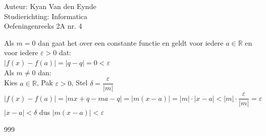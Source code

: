 \documentclass[a4paper]{article}
\begin{document}
  
\noindent \large Auteur: Kyan Van den Eynde \\
\noindent \large Studierichting: Informatica\\
\noindent \large Oefeningenreeks 2A nr. 4\\

\medskip

\normalsize

Als $m=0$ dan gaat het over een constante functie en geldt voor iedere $a\in\mathbb{R}$ en voor iedere $\varepsilon > 0$ dat:\\

$|f(x)-f(a)| = |q-q| = 0 < \varepsilon$\\

Als $m\neq 0$ dan:\\

Kies $a \in \mathbb{R}$, Pak $\varepsilon > 0$, Stel $\delta = \dfrac{\varepsilon}{|m|}$\\

$|f(x)-f(a)| = |mx+q-ma-q| = |m(x-a)| = |m|\cdot |x-a| < |m| \cdot \dfrac{\varepsilon}{|m|} = \varepsilon$\\

$|x-a| < \delta$ dus $|m(x-a)| < \varepsilon$\\

\begin{thebibliography}{999}
\end{thebibliography}
\end{document}
